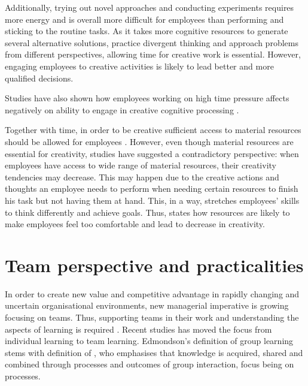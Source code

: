 Additionally, trying out novel approaches and conducting experiments requires more energy and is overall more difficult for employees than performing and sticking to the routine tasks. As it takes more cognitive resources to generate several alternative solutions, practice divergent thinking and approach problems from different perspectives, allowing time for creative work is essential. However, engaging employees to creative activities is likely to lead better and more qualified decisions. \citep{shalley2004leaders}

Studies have also shown how employees working on high time pressure affects negatively on ability to engage in creative cognitive processing \citep{amabile2002creativity}.

Together with time, in order to be creative sufficient access to material resources should be allowed for employees \citep{katz1985project}. However, even though material resources are essential for creativity, studies have suggested a contradictory perspective: when employees have access to wide range of material resources, their creativity tendencies may decrease. This may happen due to the creative actions and thoughts an employee needs to perform when needing certain resources to finish his task but not having them at hand. This, in a way, stretches employees' skills to think differently and achieve goals. \citep{csikszentmihalyi199916} Thus, \citet{csikszentmihalyi199916} states how resources are likely to make employees feel too comfortable and lead to decrease in creativity. 

\section{Team perspective and practicalities}
In order to create new value and competitive advantage in rapidly changing and uncertain organisational environments, new managerial imperative is growing focusing on teams. Thus, supporting teams in their work and understanding the aspects of learning is required \citep{edmondson1999psychological}. Recent studies has moved the focus from individual learning to team learning. Edmondson's definition of group learning stems with definition of \citet{argote2001group}, who emphasises that knowledge is acquired, shared and combined through processes and outcomes of group interaction, focus being on processes. 

